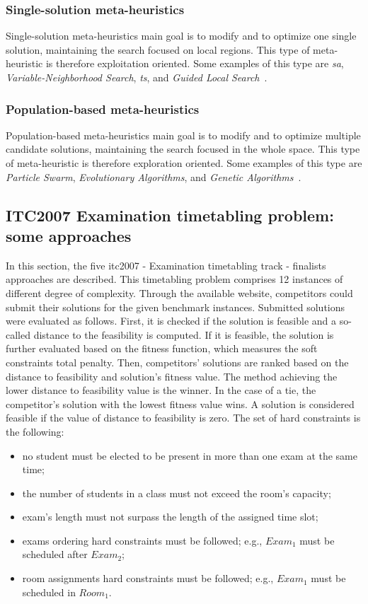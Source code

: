 \subsubsection{Single-solution meta-heuristics}
Single-solution meta-heuristics main goal is to modify and to optimize one single solution, maintaining the search focused on local regions. This type of meta-heuristic is therefore exploitation oriented. Some examples of this type are \textit{\gls{sa}}, \textit{Variable-Neighborhood Search}, \textit{\gls{ts}}, and \textit{Guided Local Search}~\cite{Talbi2009}. 

\subsubsection{Population-based meta-heuristics}
Population-based meta-heuristics main goal is to modify and to optimize multiple candidate solutions, maintaining the search focused in the whole space. This type of meta-heuristic is therefore exploration oriented. Some examples of this type are \textit{Particle Swarm}, \textit{Evolutionary Algorithms}, and \textit{Genetic Algorithms}~\cite{Talbi2009}.

\subsection{ITC2007 Examination timetabling problem: some approaches}
\label{subsection:ApprITC2007}

In this section, the five \gls{itc2007} - Examination timetabling track - finalists approaches are described. This timetabling problem comprises 12 instances of different degree of complexity. Through the available website, competitors could submit their solutions for the given benchmark instances. Submitted solutions were evaluated as follows. First, it is checked if the solution is feasible and a so-called distance to the feasibility is computed. If it is feasible, the solution is further evaluated based on the fitness function, which measures the soft constraints total penalty. Then, competitors' solutions are ranked based on the distance to feasibility and solution's fitness value. The method achieving the lower distance to feasibility value is the winner. In the case of a tie, the competitor's solution with the lowest fitness value wins. A solution is considered feasible if the value of distance to feasibility is zero. The set of hard constraints is the following:
\begin{itemize}
	\item no student must be elected to be present in more than one exam at the same time;
	\item the number of students in a class must not exceed the room's capacity;
	\item exam's length must not surpass the length of the assigned time slot;
	\item exams ordering hard constraints must be followed; e.g., $Exam_1$ must be scheduled after $Exam_2$;
	\item room assignments hard constraints must be followed; e.g., 	$Exam_1$ must be scheduled in $Room_1$.
\end{itemize}

